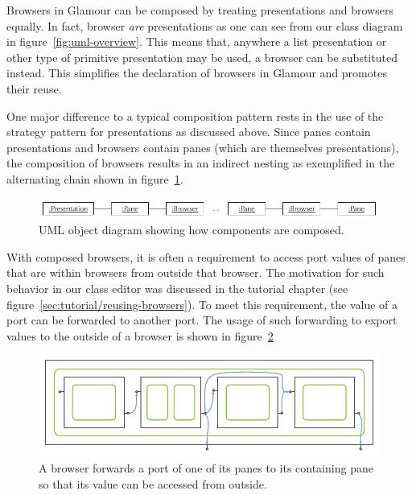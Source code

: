 \documentclass[a4paper,10pt,twoside]{book}
\begin{document}
Browsers in Glamour can be composed by treating presentations and browsers equally. In fact, browser \emph{are} presentations as one can see from our class diagram in figure~\ref{fig:uml-overview}. This means that, anywhere a list presentation or other type of primitive presentation may be used, a browser can be substituted instead. This simplifies the declaration of browsers in Glamour and promotes their reuse.

One major difference to a typical composition pattern rests in the use of the strategy pattern for presentations as discussed above. Since panes contain presentations and browsers contain panes (which are themselves presentations), the composition of browsers results in an indirect nesting as exemplified in the alternating chain shown in figure~\ref{fig:uml-object-chain}.

\begin{figure}[htbp]
\centerline{\includegraphics[width=\linewidth]{uml_object_chain.pdf}}
\caption{UML object diagram showing how components are composed.}
\label{fig:uml-object-chain}
\end{figure}


With composed browsers, it is often a requirement to access port values of panes that are within browsers from outside that browser. The motivation for such behavior in our class editor was discussed in the tutorial chapter (see figure~\ref{sec:tutorial/reusing-browsers}). To meet this requirement, the value of a port can be forwarded to another port. The usage of such forwarding to export values to the outside of a browser is shown in figure~\ref{fig:abs-port_publishing}

\begin{figure}[htbp]
\centerline{\includegraphics[width=\linewidth]{portpublishing.pdf}}
\caption{A browser forwards a port of one of its panes to its containing pane so that its value can be accessed from outside.}
\label{fig:abs-port_publishing}
\end{figure}
\end{document}
